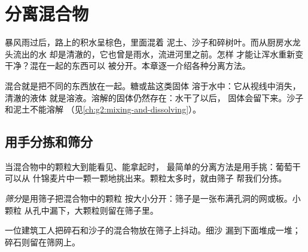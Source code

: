 \chapter{分离混合物}\label{ch:g3:separating-mixtures}

暴风雨过后，路上的积水呈棕色，里面混着
泥土、沙子和碎树叶。而从厨房水龙头流出的水
却是清澈的，它也曾是雨水，流进河里之前。怎样
才能让浑水重新变干净？混在一起的东西可以
被分开。本章逐一介绍各种分离方法。

\begin{recall}
混合就是把不同的东西放在一起。糖或盐这类固体
溶于水中：它从视线中消失，清澈的液体
就是溶液。溶解的固体仍然存在：水干了以后，
固体会留下来。沙子和泥土不能溶解
（见\cref{ch:g2:mixing-and-dissolving}）。
\end{recall}

\section{用手分拣和筛分}

当混合物中的颗粒大到能看见、能拿起时，
最简单的分离方法是用手挑：葡萄干可以从
什锦麦片中一颗一颗地挑出来。颗粒太多时，就由筛子
帮我们分拣。

\begin{definition}[筛分]\label{def:g3:separating-mixtures:sieve}
\emph{筛分}是用筛子把混合物中的颗粒
按大小分开：筛子是一张布满孔洞的网或板。小颗粒
从孔中漏下，大颗粒则留在筛子里。
\end{definition}

\begin{example}[碎石和沙子]\label{ex:g3:separating-mixtures:gravel}
一位建筑工人把碎石和沙子的混合物放在筛子上抖动。细沙
漏到下面堆成一堆；碎石则留在筛网上。
\end{example}

